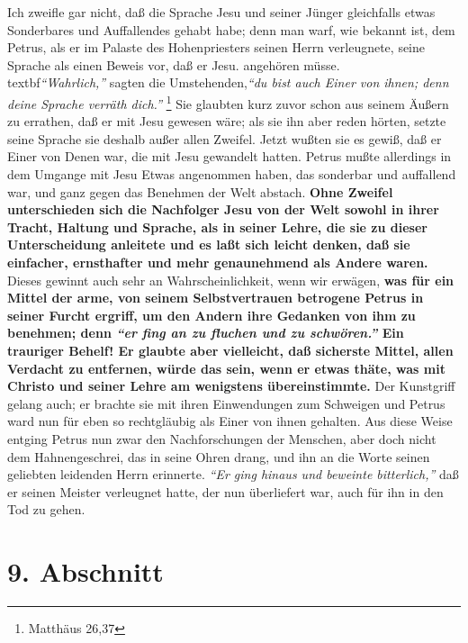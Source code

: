Ich zweifle gar nicht, daß die Sprache Jesu und seiner Jünger gleichfalls etwas
Sonderbares und Auffallendes gehabt habe; denn man warf, wie bekannt ist, dem
Petrus, als er im Palaste des Hohenpriesters seinen Herrn verleugnete, seine
Sprache als einen Beweis vor, daß er Jesu. angehören müsse.
\\textbf{\textit{"`Wahrlich,"'} sagten
die Umstehenden,}\textit{"`du bist auch Einer von ihnen; denn deine Sprache verräth
dich."'}
\footnote{Matthäus 26,37}
Sie glaubten kurz zuvor schon aus seinem Äußern
zu errathen, daß er mit Jesu gewesen wäre; als sie ihn aber reden hörten, setzte
seine Sprache sie deshalb außer allen Zweifel. Jetzt wußten sie es gewiß, daß er
Einer von Denen war, die mit Jesu gewandelt hatten. Petrus mußte allerdings in
dem Umgange mit Jesu Etwas angenommen haben, das sonderbar und auffallend war,
und ganz gegen das Benehmen der Welt abstach. \textbf{Ohne Zweifel unterschieden sich
die  Nachfolger Jesu von der Welt sowohl in ihrer Tracht, Haltung und Sprache,
als in seiner Lehre, die sie zu dieser Unterscheidung anleitete und es laßt sich
leicht denken, daß sie einfacher, ernsthafter und mehr genaunehmend als Andere
waren.} Dieses gewinnt auch sehr an Wahrscheinlichkeit, wenn wir erwägen, \textbf{was für
ein Mittel der arme, von seinem Selbstvertrauen betrogene Petrus in seiner
Furcht ergriff, um den Andern ihre Gedanken von ihm zu benehmen; denn \textit{"`er fing
an zu fluchen und zu schwören."'} Ein trauriger Behelf! Er glaubte aber
vielleicht, daß sicherste Mittel, allen Verdacht zu entfernen, würde das sein,
wenn er etwas thäte, was mit Christo und seiner Lehre am wenigstens
übereinstimmte.} Der Kunstgriff gelang auch; er brachte sie mit ihren
Einwendungen zum Schweigen und Petrus ward nun für eben so rechtgläubig als
Einer von ihnen gehalten. Aus diese Weise entging Petrus nun zwar den
Nachforschungen der Menschen, aber doch nicht dem Hahnengeschrei, das in seine
Ohren drang, und ihn an die Worte seinen geliebten leidenden Herrn erinnerte.
\textit{"`Er ging hinaus und beweinte bitterlich,"'} daß er seinen Meister verleugnet
hatte, der nun überliefert war, auch für ihn in den Tod zu gehen.

\section{9. Abschnitt} \label{kap10_ab9}

